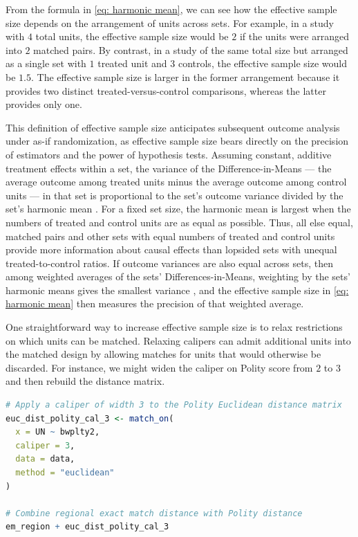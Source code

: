 \documentclass[twoside,11pt]{article}
\begin{document}
From the formula in \eqref{eq: harmonic mean}, we can see how the
effective sample size depends on the arrangement of units across sets.
For example, in a study with \(4\) total units, the effective sample
size would be \(2\) if the units were arranged into \(2\) matched pairs.
By contrast, in a study of the same total size but arranged as a single
set with \(1\) treated unit and \(3\) controls, the effective sample
size would be \(1.5\). The effective sample size is larger in the former
arrangement because it provides two distinct treated-versus-control
comparisons, whereas the latter provides only one.

This definition of effective sample size anticipates subsequent outcome
analysis under as-if randomization, as effective sample size bears
directly on the precision of estimators and the power of hypothesis
tests. Assuming constant, additive treatment effects within a set, the
variance of the Difference-in-Means --- the average outcome among
treated units minus the average outcome among control units --- in that
set is proportional to the set's outcome variance divided by the set's
harmonic mean \citep{hansenbowers2008, hansen2011}. For a fixed set size, the harmonic mean is
largest when the numbers of treated and control units are as equal as possible. Thus,
all else equal, matched pairs and other sets with equal numbers of treated and control units provide more
information about causal effects than lopsided sets with unequal treated-to-control ratios. If outcome variances are also equal across sets, then among weighted averages of the sets' Differences-in-Means,
weighting by the sets' harmonic means gives the smallest variance
\citep[p.~164, fn.~3]{hansen2011}, and the effective sample size in
\eqref{eq: harmonic mean} then measures the precision of that weighted
average.

One straightforward way to increase effective sample size is to relax
restrictions on which units can be matched. Relaxing calipers can admit
additional units into the matched design by allowing matches for units
that would otherwise be discarded. For instance, we might widen the
caliper on Polity score from \(2\) to \(3\) and then rebuild the
distance matrix.



\begin{lstlisting}[language=R]
# Apply a caliper of width 3 to the Polity Euclidean distance matrix
euc_dist_polity_cal_3 <- match_on(
  x = UN ~ bwplty2,
  caliper = 3,
  data = data,
  method = "euclidean"
)

# Combine regional exact match distance with Polity distance
em_region + euc_dist_polity_cal_3
\end{lstlisting}
\end{document}
